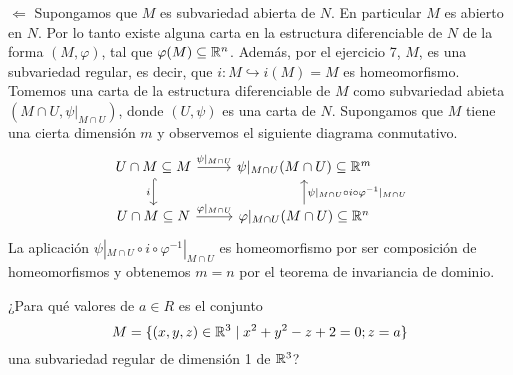 \documentclass[twoside]{article}
\newcounter{ejercicio}
\begin{document}
\begin{solucion}
$\boxed{\Leftarrow}$ Supongamos que $M$ es subvariedad abierta de $N$. En particular $M$ es abierto en $N$. Por lo tanto existe alguna carta en la estructura diferenciable de $N$ de la forma $(M, \varphi)$, tal que $\varphi(M)\subseteq\mathbb{R}^n$. Además, por el ejercicio 7, $M$, es una subvariedad regular, es decir, que $i:M\hookrightarrow i(M)=M$ es homeomorfismo. Tomemos una carta de la estructura diferenciable de $M$ como subvariedad abieta $(M\cap U,\psi|_{M\cap U})$, donde $(U,\psi)$ es una carta de $N$. Supongamos que $M$ tiene una cierta dimensión $m$ y observemos el siguiente diagrama conmutativo.
\[
\begin{tikzcd}
U\cap M\subseteq M\arrow[r,"\psi|_{M\cap U}"]\arrow[d,hookrightarrow, "i"'] & \psi|_{M\cap U}(M\cap U)\subseteq \R^m\\
U\cap M\subseteq N\arrow[r,"\varphi|_{M\cap U}"] & \varphi|_{M\cap U}(M\cap U)\subseteq\R^n\arrow[u, "\psi|_{M\cap U}\circ i\circ\varphi^{-1}|_{M\cap U}"']
\end{tikzcd}
\]
La aplicación $\psi|_{M\cap U}\circ i\circ\varphi^{-1}|_{M\cap U}$ es homeomorfismo por ser composición de homeomorfismos y obtenemos $m=n$ por el teorema de invariancia de dominio.
\end{solucion}

\newpage

\begin{ejercicio}{15}
¿Para qué valores de $a \in R$ es el conjunto
$$M = \{(x, y, z) \in \mathbb{R}^3\mid x^2 + y^2 - z + 2 = 0; z = a\}$$
una subvariedad regular de dimensión 1 de $\mathbb{R}^3$?
\end{ejercicio}
\begin{solucion}
\end{solucion}
\end{document}
